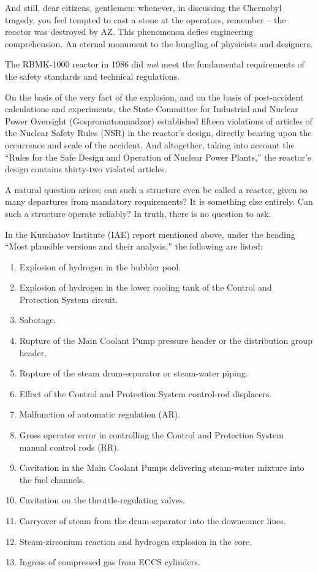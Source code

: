\documentclass[openright]{bookest}
\begin{document}
And still, dear citizens, gentlemen: whenever, in discussing the Chernobyl tragedy, you feel tempted to cast a stone at the operators, remember -- the reactor was destroyed by AZ. This phenomenon defies engineering comprehension. An eternal monument to the bungling of physicists and designers.

The RBMK-1000 reactor in 1986 did \textit{not} meet the fundamental requirements of the safety standards and technical regulations.

On the basis of the very fact of the explosion, and on the basis of post-accident calculations and experiments, the State Committee for Industrial and Nuclear Power Oversight (Gospromatomnadzor) established fifteen violations of articles of the Nuclear Safety Rules (NSR) in the reactor's design, directly bearing upon the occurrence and scale of the accident. And altogether, taking into account the ``Rules for the Safe Design and Operation of Nuclear Power Plants,'' the reactor's design contains thirty-two violated articles.

A natural question arises: can such a structure even be called a reactor, given so many departures from mandatory requirements? It is something else entirely. Can such a structure operate reliably? In truth, there is no question to ask.

In the Kurchatov Institute (IAE) report mentioned above, under the heading ``Most plausible versions and their analysis,'' the following are listed:

\begin{enumerate}
\item[3.1] Explosion of hydrogen in the bubbler pool.
\item[3.2] Explosion of hydrogen in the lower cooling tank of the Control and Protection System circuit.
\item[3.3] Sabotage.
\item[3.4] Rupture of the Main Coolant Pump pressure header or the distribution group header.
\item[3.5] Rupture of the steam drum-separator or steam-water piping.
\item[3.6] Effect of the Control and Protection System control-rod displacers.
\item[3.7] Malfunction of automatic regulation (AR).
\item[3.8] Gross operator error in controlling the Control and Protection System manual control rods (RR).
\item[3.9] Cavitation in the Main Coolant Pumps delivering steam-water mixture into the fuel channels.
\item[3.10] Cavitation on the throttle-regulating valves.
\item[3.11] Carryover of steam from the drum-separator into the downcomer lines.
\item[3.12] Steam-zirconium reaction and hydrogen explosion in the core.
\item[3.13] Ingress of compressed gas from ECCS cylinders.
\end{enumerate}
\end{document}
